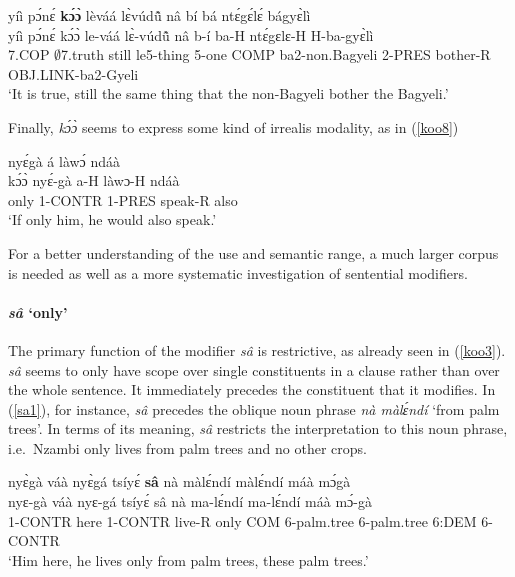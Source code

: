 \begin{exe} 
\ex\label{koo7} 
  \glll yíì pɔ́nɛ́ {\bfseries kɔ́ɔ̀} lèváá lɛ̀vúdũ̂ nâ bí bá ntɛ́gɛ́lɛ́ bágyɛ̀lì \\
       yíì pɔ́nɛ́ kɔ́ɔ̀ le-váá lɛ̀-vúdũ̂ nâ b-í ba-H ntɛ́gɛlɛ-H H-ba-gyɛ̀lì \\
         7.COP $\emptyset$7.truth still le5-thing 5-one COMP ba2-non.Bagyeli 2-PRES bother-R OBJ.LINK-ba2-Gyeli \\
    \trans `It is true, still the same thing that the non-Bagyeli bother the Bagyeli.'
\end{exe}

Finally, {\itshape kɔ́ɔ̀} seems to express some kind of irrealis modality, as in (\ref{koo8})

\begin{exe} 
\ex\label{koo8}
   nyɛ́gà á làwɔ́ ndáà \\
         kɔ́ɔ̀ nyɛ́-gà a-H làwɔ-H ndáà \\
         only 1-CONTR 1-PRES speak-R also \\
    \trans `If only him, he would also speak.'
\end{exe}


\noindent For a better understanding of the use and semantic range, a much larger corpus is needed as well as a more systematic investigation of sentential modifiers.




\paragraph{{\itshape sâ} `only'} 
The primary function of the modifier {\itshape sâ} is restrictive, as already seen in (\ref{koo3}). {\itshape sâ} seems to only have scope over single constituents in a clause rather than over the whole sentence. It immediately precedes the constituent that it modifies. In (\ref{sa1}), for instance, {\itshape sâ} precedes the oblique noun phrase {\itshape nà màlɛ́ndí} `from palm trees'. In terms of its meaning, {\itshape sâ} restricts the interpretation to this noun phrase, i.e.\ Nzambi only lives from palm trees and no other crops.

\begin{exe} 
\ex\label{sa1}
  \glll nyɛ̀gà váà nyɛ̀gá tsíyɛ́ {\bfseries sâ} nà màlɛ́ndí màlɛ́ndí máà mɔ́gà \\
         nyɛ-gà váà nyɛ-gá tsíyɛ́ sâ nà ma-lɛ́ndí ma-lɛ́ndí máà mɔ́-gà \\
          1-CONTR here 1-CONTR live-R only COM 6-palm.tree 6-palm.tree 6:DEM 6-CONTR \\
    \trans `Him here, he lives only from palm trees, these palm trees.'
\end{exe}

